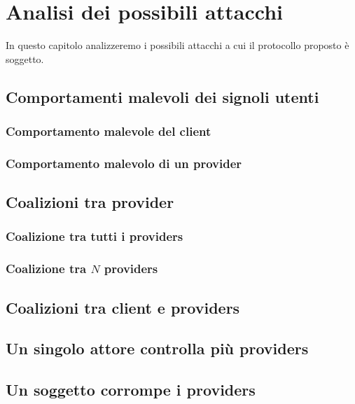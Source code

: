 \chapter{Analisi dei possibili attacchi}
\label{chap:analisi-attacchi}

In questo capitolo analizzeremo i possibili attacchi a cui il protocollo proposto
è soggetto.
\section{Comportamenti malevoli dei signoli utenti}
\subsection{Comportamento malevole del client}
\subsection{Comportamento malevolo di un provider}


\section{Coalizioni tra provider}
\subsection{Coalizione tra tutti i providers}
\subsection{Coalizione tra $ N $ providers}

\section{Coalizioni tra client e providers}

\section{Un singolo attore controlla più providers}

\section{Un soggetto corrompe i providers}
